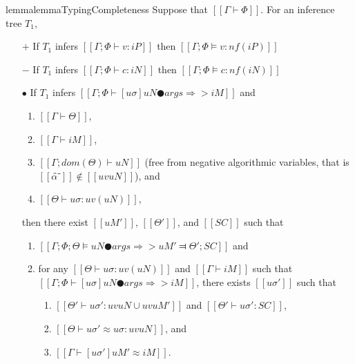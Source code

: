 \begin{restatable}{lemma}{lemmaTypingCompleteness}
    \label{lemma:typing-completeness}
    Suppose that $[[Γ ⊢ Φ]]$.
    For an inference tree $T_1$,
    \begin{itemize}
        \item [$+$] If $T_1$ infers $[[Γ; Φ ⊢ v : iP]]$ then $[[Γ; Φ ⊨ v : nf(iP)]]$        
        \item [$-$] If $T_1$ infers $[[Γ; Φ ⊢ c : iN]]$ then  $[[Γ; Φ ⊨ c : nf(iN)]]$
        \item [$\bullet$] If 
            $T_1$ infers $[[Γ; Φ ⊢ [uσ]uN ● args ⇒> iM]]$
            and 
            \begin{enumerate}
                \item $[[Γ ⊢ Θ]]$, 
                \item $[[Γ ⊢ iM]]$,
                \item $[[Γ; dom(Θ) ⊢ uN]]$ (free from negative algorithmic variables, that is $[[α̂⁻]] \notin [[uv uN]]$), and
                \item $[[Θ ⊢ uσ : uv(uN)]]$,
            \end{enumerate}
            then there exist $[[uM']]$, $[[Θ']]$, and $[[SC]]$ such that
            \begin{enumerate}
                \item $[[ Γ; Φ; Θ ⊨ uN ● args ⇒> uM' ⫤ Θ'; SC ]]$ and
                \item for any $[[Θ ⊢ uσ : uv(uN)]]$ and $[[Γ ⊢ iM]]$
                    such that $[[Γ; Φ ⊢ [uσ]uN ● args ⇒> iM]]$, 
                    there exists $[[uσ']]$ such that 
                    \begin{enumerate}
                        \item $[[Θ' ⊢ uσ' : uv uN ∪ uv uM']]$
                            and $[[Θ' ⊢ uσ' : SC]]$,
                        \item $[[Θ ⊢ uσ' ≈ uσ : uv uN]]$, and 
                        \item $[[Γ ⊢ [uσ']uM' ≈ iM]]$.
                    \end{enumerate}
            \end{enumerate}
    \end{itemize}
\end{restatable}
